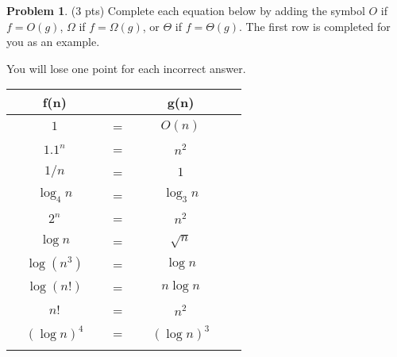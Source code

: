 \documentclass[12pt]{exam}
\newcommand*{\hl}[1]{\colorbox{yellow}{#1}}
\newcommand*{\answerLong}[2]{
    \ifprintanswers{\hl{#1}}
\else{#2}
\fi
}
\newcommand*{\answer}[1]{\answerLong{#1}{~}}
\theoremstyle{definition}
\newtheorem{problem}{Problem}
\begin{document}
\newpage
\begin{problem}
(3 pts)
    Complete each equation below by adding the symbol $O$ if $f=O(g)$, $\Omega$ if $f=\Omega(g)$, or $\Theta$ if $f=\Theta(g)$.  
    The first row is completed for you as an example.

    You will lose one point for each incorrect answer.

{\renewcommand{\arraystretch}{3.4}
\begin{tabular}{c c c c c c}
    & f(n) &~\hspace{0.5in}~$ $~\hspace{0.5in}~& g(n) &\\
    \hline
    & $1$ & ~\hspace{0.5in}~$=$~\hspace{0.5in}~  & $O(n)$ &  &\\
    \arrayrulecolor{gray}\hline
    & $1.1^n$ & ~\hspace{0.5in}~$=$~\hspace{0.5in}~  & \answer{$\Omega$} $n^2$ &  &\\
    \arrayrulecolor{gray}\hline
    & $1/n$ & ~\hspace{0.5in}~$=$~\hspace{0.5in}~  & \answer{$O$} $1$ &  &\\
    \arrayrulecolor{gray}\hline
    & $\log_4 n$ & ~\hspace{0.5in}~$=$~\hspace{0.5in}~  & \answer{$\Theta$} $\log_3 n$ &  &\\
    \arrayrulecolor{gray}\hline
    & $2^{n}$ & ~\hspace{0.5in}~$=$~\hspace{0.5in}~  & \answer{$\Omega$} $n^2$ &  &\\
    \arrayrulecolor{gray}\hline
    & $\log n$ & ~\hspace{0.5in}~$=$~\hspace{0.5in}~  & \answer{$O$} $\sqrt n$ &  &\\
    \arrayrulecolor{gray}\hline
    & $\log (n^3)$ & ~\hspace{0.5in}~$=$~\hspace{0.5in}~  & \answer{$\Theta$} $\log n$ &  &\\
    \arrayrulecolor{gray}\hline
    & $\log (n!)$ & ~\hspace{0.5in}~$=$~\hspace{0.5in}~  & \answer{$\Theta$} $n\log n$ &  &\\
    \arrayrulecolor{gray}\hline
    & $n!$ & ~\hspace{0.5in}~$=$~\hspace{0.5in}~  & \answer{$\Omega$} $n^2$ &  &\\
    \arrayrulecolor{gray}\hline
    & $(\log n)^4$ & ~\hspace{0.5in}~$=$~\hspace{0.5in}~  & \answer{$\Omega$} $(\log n)^3$ &  &\\
    \arrayrulecolor{gray}\hline


\end{tabular}}
\end{problem}
\end{document}
